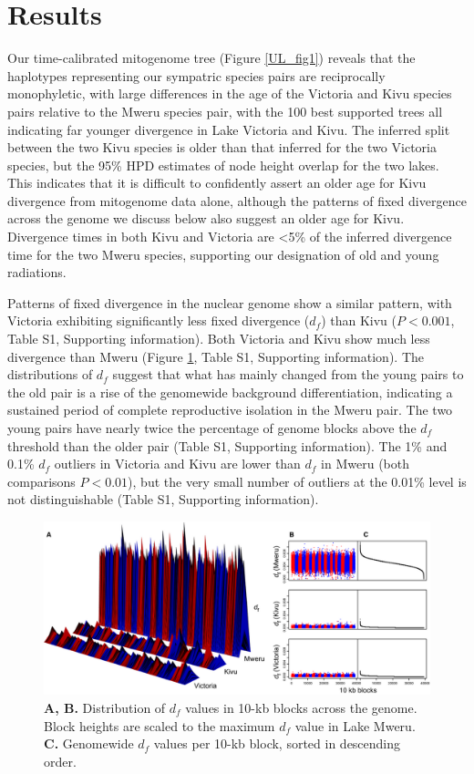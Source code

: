\section{Results}

Our time-calibrated mitogenome tree (Figure \ref{UL_fig1}) reveals that the haplotypes representing our sympatric species pairs are reciprocally monophyletic, with large differences in the age of the Victoria and Kivu species pairs relative to the Mweru species pair, with the 100 best supported trees all indicating far younger divergence in Lake Victoria and Kivu. The inferred split between the two Kivu species is older than that inferred for the two Victoria species, but the 95\% HPD estimates of node height overlap for the two lakes. This indicates that it is difficult to confidently assert an older age for Kivu divergence from mitogenome data alone, although the patterns of fixed divergence across the genome we discuss below also suggest an older age for Kivu. Divergence times in both Kivu and Victoria are <5\% of the inferred divergence time for the two Mweru species, supporting our designation of old and young radiations.

Patterns of fixed divergence in the nuclear genome show a similar pattern, with Victoria exhibiting significantly less fixed divergence ($d_f$) than Kivu ($P < 0.001$, Table S1, Supporting information). Both Victoria and Kivu show much less divergence than Mweru (Figure \ref{UL_fig2}, Table S1, Supporting information). The distributions of $d_f$ suggest that what has mainly changed from the young pairs to the old pair is a rise of the genomewide background differentiation, indicating a sustained period of complete reproductive isolation in the Mweru pair. The two young pairs have nearly twice the percentage of genome blocks above the $d_f$ threshold than the older pair (Table S1, Supporting information). The 1\% and 0.1\% $d_f$ outliers in Victoria and Kivu are lower than $d_f$ in Mweru (both comparisons $P < 0.01$), but the very small number of outliers at the 0.01\% level is not distinguishable (Table S1, Supporting information).

\begin{figure}
\centering
\includegraphics[width=\textwidth]{uLakes/figures/fig2}
\caption{\textbf{A, B.} Distribution of $d_f$ values in 10-kb blocks across the genome. Block heights are scaled to the maximum $d_f$ value in Lake Mweru. \textbf{C.} Genomewide $d_f$ values per 10-kb block, sorted in descending order.}
\label{UL_fig2}
\end{figure}


